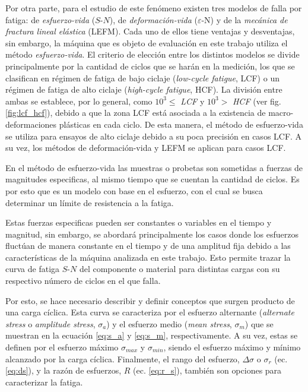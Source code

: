 Por otra parte, para el estudio de este fenómeno existen tres modelos de falla por fatiga: de \textit{esfuerzo-vida} ($S$-$N$), de \textit{deformación-vida }($\varepsilon$-N) y de la \textit{mecánica de fractura lineal elástica} (LEFM). Cada uno de ellos tiene ventajas y desventajas, sin embargo, la máquina que es objeto de evaluación en este trabajo utiliza el método \textit{esfuerzo-vida}. El criterio de elección entre los distintos modelos se divide principalmente por la cantidad de ciclos que se harán en la medición, los que se clasifican en régimen de fatiga de bajo ciclaje (\textit{low-cycle fatigue}, LCF) o un régimen de fatiga de alto ciclaje (\textit{high-cycle fatigue}, HCF). La división entre ambas se establece, por lo general, como $10^3 \leq$ \textit{LCF} y $10^3 >$ \textit{HCF} \cite{budynas2008shigley} (ver fig. \ref{fig:lcf_hcf}), debido a que la zona LCF está asociada a la existencia de macro-deformaciones plásticas en cada ciclo. De esta manera, el método de esfuerzo-vida se utiliza para ensayos de alto ciclaje debido a su poca precisión en casos LCF. A su vez, los métodos de deformación-vida y LEFM se aplican para casos LCF.

En el método de esfuerzo-vida las muestras o probetas son sometidas a fuerzas de magnitudes especificas, al mismo tiempo que se cuentan la cantidad de ciclos. Es por esto que es un modelo con base en el esfuerzo, con el cual se busca determinar un límite de resistencia a la fatiga. 

Estas fuerzas especificas pueden ser constantes o variables en el tiempo y magnitud, sin embargo, se abordará principalmente los casos donde los esfuerzos fluctúan de manera constante en el tiempo y de una amplitud fija debido a las características de la máquina analizada en este trabajo. Esto permite trazar la curva de fatiga $S$-$N$ del componente o material para distintas cargas con su respectivo número de ciclos en el que falla.

Por esto, se hace necesario describir y definir conceptos que surgen producto de una carga cíclica. Esta curva se caracteriza por el esfuerzo alternante (\textit{alternate stress} o \textit{amplitude stress}, $\sigma_a$) y el esfuerzo medio (\textit{mean stress}, $\sigma_m$) que se muestran en la ecuación \ref{eq:s_a} y \ref{eq:s_m}, respectivamente. A su vez, estas se definen por el esfuerzo máximo $\sigma_{max}$ y $\sigma_{min}$, siendo el esfuerzo máximo y mínimo alcanzado por la carga cíclica. Finalmente, el rango del esfuerzo, $\Delta \sigma$ o $\sigma_r$ (ec. \ref{eq:ds}), y la razón de esfuerzos, $R$ (ec. \ref{eq:r_s}), también son opciones  para caracterizar la fatiga.


